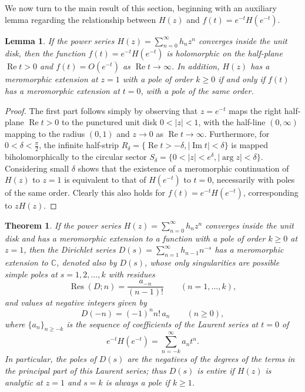 \documentclass[11pt,a4paper]{amsart}
\newcommand{\C}{\mathbb{C}}
\renewcommand{\Re}{\operatorname{Re}}
\renewcommand{\Im}{\operatorname{Im}}
\newcommand{\Res}{\operatorname{Res}}
\theoremstyle{plain}
\newtheorem{theorem}{Theorem}
\theoremstyle{plain}
\theoremstyle{plain}
\newtheorem{lemma}{Lemma}
\theoremstyle{definition}
\theoremstyle{remark}
\begin{document}
We now turn to the main result of this section, beginning with an auxiliary lemma regarding the relationship between $H(z)$ and $f(t) = e^{-t} H(e^{-t})$.

\begin{lemma}
\label{lem:continuation_eHe}
If the power series $H(z) = \sum_{n=0}^{\infty} h_{n} z^{n}$ converges inside the unit disk, then the function $f(t) = e^{-t} H(e^{-t})$ is holomorphic on the half-plane $\Re t > 0$ and $f(t) = O(e^{-t})$ as $\Re t \to \infty$. In addition, $H(z)$ has a meromorphic extension at $z=1$ with a pole of order $k \geq 0$ if and only if $f(t)$ has a meromorphic extension at $t = 0$, with a pole of the same order.
\end{lemma}

\begin{proof}
The first part follows simply by observing that $z = e^{-t}$ maps the right half-plane $\Re t > 0$ to the punctured unit disk $0 < |z| < 1$, with the half-line $(0,\infty)$ mapping to the radius $(0,1)$ and $z \to 0$ as $\Re t \to \infty$. Furthermore, for $0 < \delta < \frac{\pi}{2}$, the infinite half-strip $R_{\delta} = \{\Re t > -\delta, |\Im t| < \delta\}$ is mapped biholomorphically to the circular sector $S_{\delta} = \{0 < |z| < e^{\delta}, |\arg z| < \delta\}$. 
Considering small $\delta$ shows that the existence of a meromorphic continuation of $H(z)$ to $z=1$ is equivalent to that of $H(e^{-t})$ to $t=0$, necessarily with poles of the same order. Clearly this also holds for $f(t) = e^{-t} H(e^{-t})$, corresponding to $z H(z)$.
\end{proof}



\begin{theorem}
\label{th:prolongarpor1}
If the power series $H(z) = \sum_{n=0}^{\infty} h_{n} z^{n}$ converges inside the unit disk and has a meromorphic extension to a function with a pole of order $k \geq 0$ at $z=1$, then the Dirichlet series $D(s) = \sum_{n=1}^{\infty} h_{n-1} n^{-s}$ has a meromorphic extension to $\C$, denoted also by $D(s)$, whose only singularities are possible simple poles at $s=1,2,\dots,k$ with residues
\begin{equation}
\label{eq:residues}
  \Res(D;n) =\frac{a_{-n}}{(n-1)!} \qquad  (n=1,\dots,k),
\end{equation}
and values at negative integers given by
\begin{equation}
\label{eq:valores-n}
  D(-n) = (-1)^{n} n!\, a_{n} \qquad (n\geq 0),
\end{equation}
where $\{a_{n}\}_{n\ge-k}$ is the sequence of coefficients of the Laurent series at $t = 0$ of
\[
  e^{-t} H(e^{-t}) = \sum_{n=-k}^{\infty} a_{n} t^{n}.
\]
% 
In particular, the poles of $D(s)$ are the negatives of the degrees of the terms in the principal part of this Laurent series; thus $D(s)$ is entire if $H(z)$ is analytic at $z=1$ and $s=k$ is always a pole if $k \geq 1$.
\end{theorem}
\end{document}
